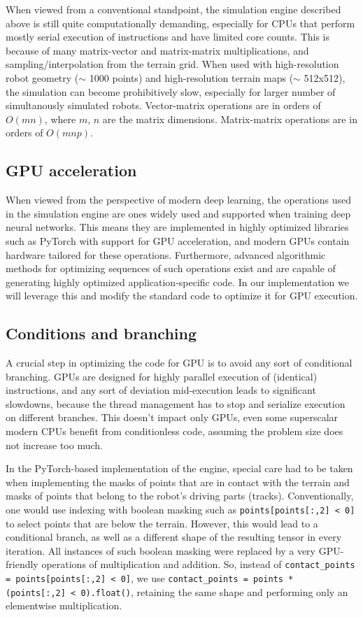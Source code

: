 \documentclass[a4paper,12pt]{article}
\begin{document}
When viewed from a conventional standpoint, the simulation engine described above is still quite computationally demanding, especially for CPUs that perform mostly serial execution of instructions and have limited core counts. This is because of many matrix-vector and matrix-matrix multiplications, and sampling/interpolation from the terrain grid. When used with high-resolution robot geometry ($\sim$ 1000 points) and high-resolution terrain maps ($\sim$ 512x512), the simulation can become prohibitively slow, especially for larger number of simultanously simulated robots. Vector-matrix operations are in orders of $O(mn)$, where $m$, $n$ are the matrix dimensions. Matrix-matrix operations are in orders of $O(mnp)$. 

\subsection{GPU acceleration}

When viewed from the perspective of modern deep learning, the operations used in the simulation engine are ones widely used and supported when training deep neural networks. This means they are implemented in highly optimized libraries such as PyTorch \citep{paszke2019pytorchimperativestylehighperformance} with support for GPU acceleration, and modern GPUs contain hardware tailored for these operations. Furthermore, advanced algorithmic methods for optimizing sequences of such operations exist and are capable of generating highly optimized application-specific code. In our implementation we will leverage this and modify the standard code to optimize it for GPU execution.

\subsection{Conditions and branching}
A crucial step in optimizing the code for GPU is to avoid any sort of conditional branching. GPUs are designed for highly parallel execution of (identical) instructions, and any sort of deviation mid-execution leads to significant slowdowns, because the thread management has to stop and serialize execution on different branches. This doesn't impact only GPUs, even some superscalar modern CPUs benefit from conditionless code, assuming the problem size does not increase too much.

In the PyTorch-based implementation of the engine, special care had to be taken when implementing the masks of points that are in contact with the terrain and masks of points that belong to the robot's driving parts (tracks). Conventionally, one would use indexing with boolean masking such as \texttt{points[points[:,2] < 0]} to select points that are below the terrain. However, this would lead to a conditional branch, as well as a different shape of the resulting tensor in every iteration. All instances of such boolean masking were replaced by a very GPU-friendly operations of multiplication and addition. So, instead of \texttt{contact\_points = points[points[:,2] < 0]}, we use \texttt{contact\_points = points * (points[:,2] < 0).float()}, retaining the same shape and performing only an elementwise multiplication.
\end{document}
